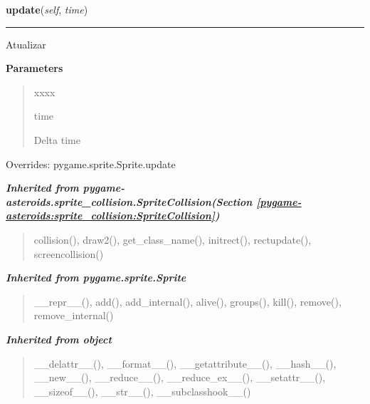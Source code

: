     \vspace{0.5ex}

\hspace{.8\funcindent}\begin{boxedminipage}{\funcwidth}

    \raggedright \textbf{update}(\textit{self}, \textit{time})

    \vspace{-1.5ex}

    \rule{\textwidth}{0.5\fboxrule}
\setlength{\parskip}{2ex}
    Atualizar

\setlength{\parskip}{1ex}
      \textbf{Parameters}
      \vspace{-1ex}

      \begin{quote}
        \begin{Ventry}{xxxx}

          \item[time]

          Delta time

        \end{Ventry}

      \end{quote}

      Overrides: pygame.sprite.Sprite.update

    \end{boxedminipage}


\large{\textbf{\textit{Inherited from pygame-asteroids.sprite\_collision.SpriteCollision\textit{(Section \ref{pygame-asteroids:sprite_collision:SpriteCollision})}}}}

\begin{quote}
collision(), draw2(), get\_class\_name(), initrect(), rectupdate(), screencollision()
\end{quote}

\large{\textbf{\textit{Inherited from pygame.sprite.Sprite}}}

\begin{quote}
\_\_repr\_\_(), add(), add\_internal(), alive(), groups(), kill(), remove(), remove\_internal()
\end{quote}

\large{\textbf{\textit{Inherited from object}}}

\begin{quote}
\_\_delattr\_\_(), \_\_format\_\_(), \_\_getattribute\_\_(), \_\_hash\_\_(), \_\_new\_\_(), \_\_reduce\_\_(), \_\_reduce\_ex\_\_(), \_\_setattr\_\_(), \_\_sizeof\_\_(), \_\_str\_\_(), \_\_subclasshook\_\_()
\end{quote}

